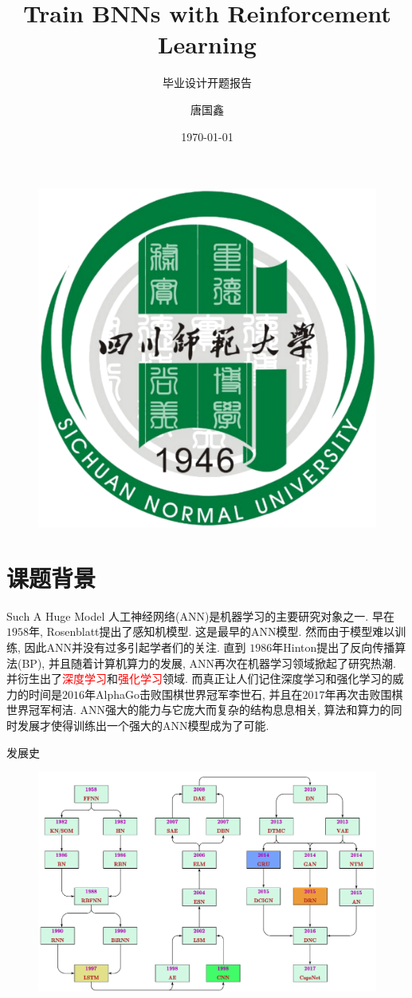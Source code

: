 \documentclass{beamer}
\title{Train BNNs with Reinforcement Learning}
\subtitle{毕业设计开题报告}
\author{唐国鑫}
\institute{四川师范大学数学科学学院}
\date{\today}
\begin{document}
\kaishu
\begin{frame}
    \titlepage
    \begin{figure}[htpb]
        \begin{center}
            \includegraphics[width=0.2\linewidth]{pic/logo.pdf}
        \end{center}
    \end{figure}
\end{frame}

\begin{frame}
    \tableofcontents[sectionstyle=show,subsectionstyle=show/shaded/hide,subsubsectionstyle=show/shaded/hide]
\end{frame}


\section{课题背景}

\begin{frame}{Such A Huge Model}
    \footnotesize
    人工神经网络(ANN)是机器学习的主要研究对象之一. 早在$1958$年, Rosenblatt提出了感知机模型. 这是最早的ANN模型. 然而由于模型难以训练, 因此ANN并没有过多引起学者们的关注. 直到 $1986$年Hinton提出了反向传播算法(BP), 并且随着计算机算力的发展, ANN再次在机器学习领域掀起了研究热潮. 并衍生出了\textcolor{red}{深度学习}和\textcolor{red}{强化学习}领域. 而真正让人们记住深度学习和强化学习的威力的时间是$2016$年AlphaGo击败围棋世界冠军李世石, 并且在$2017$年再次击败围棋世界冠军柯洁. ANN强大的能力与它庞大而复杂的结构息息相关, 算法和算力的同时发展才使得训练出一个强大的ANN模型成为了可能.
\end{frame}

\begin{frame}{发展史}
    \footnotesize
    \begin{figure}
        \centering
        \includegraphics[scale=0.3]{pic/allnn.pdf}
    \end{figure}
\end{frame}
\end{document}

